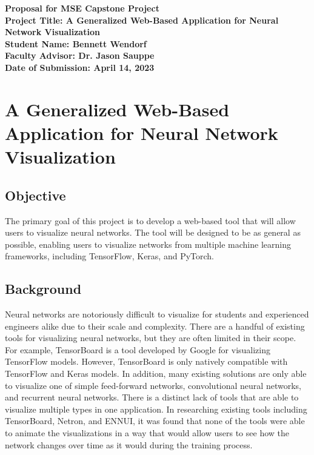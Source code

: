 \documentclass[letterpaper, 12pt]{report}
\begin{document}
\begin{titlepage}
	\begin{center}
		\vspace*{2in}
		\begin{doublespace}
			\LARGE \textbf{Proposal for MSE Capstone Project} \\
            \vspace*{0.5in}
			\large
            \textbf{Project Title: A Generalized Web-Based Application for Neural Network Visualization} \\
			\vspace*{0.5in}
			\textbf{Student Name: Bennett Wendorf} \\
            \textbf{Faculty Advisor: Dr. Jason Sauppe} \\
            \textbf{Date of Submission: April 14, 2023} \\
		\end{doublespace}
	\end{center}
\end{titlepage}

\section*{A Generalized Web-Based Application for Neural Network Visualization}

\subsection*{Objective}
The primary goal of this project is to develop a web-based tool that will allow users to visualize neural networks. The tool will be designed to be as general as possible, enabling users to visualize networks from multiple machine learning frameworks, including TensorFlow, Keras, and PyTorch. 

\subsection*{Background}
Neural networks are notoriously difficult to visualize for students and experienced engineers alike due to their scale and complexity. There are a handful of existing tools for visualizing neural networks, but they are often limited in their scope. For example, TensorBoard is a tool developed by Google for visualizing TensorFlow models. However, TensorBoard is only natively compatible with TensorFlow and Keras models. In addition, many existing solutions are only able to visualize one of simple feed-forward networks, convolutional neural networks, and recurrent neural networks. There is a distinct lack of tools that are able to visualize multiple types in one application. In researching existing tools including TensorBoard, Netron, and ENNUI, it was found that none of the tools were able to animate the visualizations in a way that would allow users to see how the network changes over time as it would during the training process.
\end{document}
